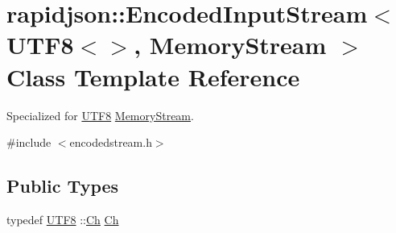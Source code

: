 \hypertarget{classrapidjson_1_1_encoded_input_stream_3_01_u_t_f8_3_4_00_01_memory_stream_01_4}{}\section{rapidjson\+::Encoded\+Input\+Stream$<$ U\+T\+F8$<$$>$, Memory\+Stream $>$ Class Template Reference}
\label{classrapidjson_1_1_encoded_input_stream_3_01_u_t_f8_3_4_00_01_memory_stream_01_4}


Specialized for \mbox{\hyperlink{structrapidjson_1_1_u_t_f8}{U\+T\+F8}} \mbox{\hyperlink{structrapidjson_1_1_memory_stream}{Memory\+Stream}}.  




{\ttfamily \#include $<$encodedstream.\+h$>$}

\subsection*{Public Types}
\begin{DoxyCompactItemize}
\item 
typedef \mbox{\hyperlink{structrapidjson_1_1_u_t_f8}{U\+T\+F8}} \+::\mbox{\hyperlink{classrapidjson_1_1_encoded_input_stream_3_01_u_t_f8_3_4_00_01_memory_stream_01_4_a907f1851cfe76ae1c3eb9e2074bfa507}{Ch}} \mbox{\hyperlink{classrapidjson_1_1_encoded_input_stream_3_01_u_t_f8_3_4_00_01_memory_stream_01_4_a907f1851cfe76ae1c3eb9e2074bfa507}{Ch}}
\end{DoxyCompactItemize}
